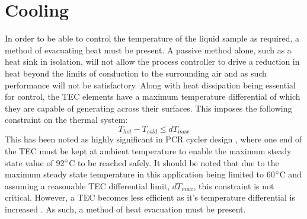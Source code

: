 \section{Cooling}
In order to be able to control the temperature of the liquid sample as required, a method of evacuating heat must be present. A passive method alone, such as a heat sink in isolation, will not allow the process controller to drive a reduction in heat beyond the limits of conduction to the surrounding air \cite{20144600208116} and as such performance will not be satisfactory. Along with heat dissipation being essential for control, the TEC elements have a maximum temperature differential of which they are capable of generating across their surfaces. This imposes the following constraint on the thermal system:
\begin{equation}
T_{hot} - T_{cold} \leq dT_{max}
\end{equation}
This has been noted as highly significant in PCR cycler design \cite{20160801988967}, where one end of the TEC must be kept at ambient temperature to enable the maximum steady state value of 92$\degree$C to be reached safely. It should be noted that due to the maximum steady state temperature in this application being limited to 60$\degree$C and assuming a reasonable TEC differential limit, $dT_{max}$, this constraint is not critical. However, a TEC becomes less efficient as it's temperature differential is increased \cite{20070113880}. As such, a method of heat evacuation must be present.\\


